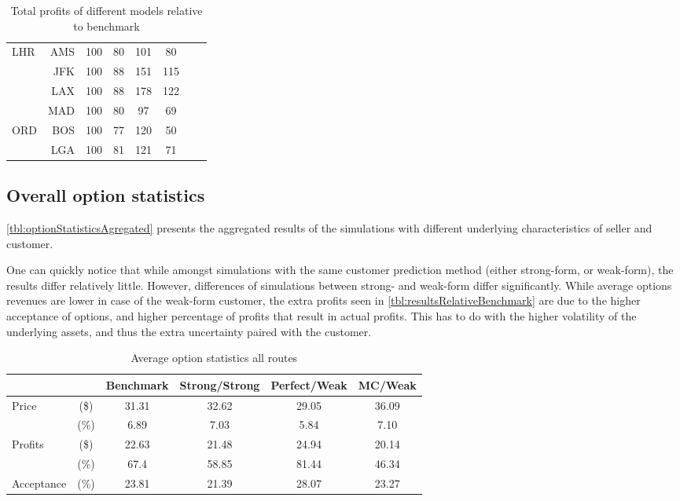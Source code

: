 \begin{table}
\begin{center}
\begin{tabular}{l r c c c c c c}
LHR  &  AMS &    100  &     80  &    101  &     80  \\
     &  JFK &    100  &     88  &    151  &    115  \\
     &  LAX &    100  &     88  &    178  &    122  \\
     &  MAD &    100  &     80  &     97  &     69  \\[.5ex]
ORD  &  BOS &    100  &     77  &    120  &     50  \\
     &  LGA &    100  &     81  &    121  &     71  \\
            \bottomrule
        \end{tabular}
        \caption{Total profits of different models relative to benchmark}
        \label{tbl:resultsRelativeBenchmark}
    \end{center}
\end{table}


\subsection{Overall option statistics}
\autoref{tbl:optionStatisticsAgregated} presents the aggregated results of the simulations with different underlying characteristics of seller and customer.

One can quickly notice that while amongst simulations with the same customer prediction method (either strong-form, or weak-form), the results differ relatively little. However, differences of simulations between strong- and weak-form differ significantly. While average options revenues are lower in case of the weak-form customer, the extra profits seen in \autoref{tbl:resultsRelativeBenchmark} are due to the higher acceptance of options, and higher percentage of profits that result in actual profits. This has to do with the higher volatility of the underlying assets, and thus the extra uncertainty paired with the customer.


\begin{table}[h]
    \small
    \begin{center}
        \begin{tabular}{l c c c c c}
            \toprule
~  &  ~  &  Benchmark  &  Strong/Strong  &  Perfect/Weak  &  MC/Weak \\[.4ex]
            \midrule
Price &  (\$)       &  31.31  &  32.62  &  29.05  &  36.09 \\
~  & (\%)           &  6.89  &  7.03    &  5.84   &  7.10 \\
Profits &  (\$)     & 22.63  &  21.48   &  24.94  &  20.14 \\
~  & (\%)           &  67.4  &  58.85   &  81.44   &  46.34 \\
Acceptance &  (\%)  &  23.81  &  21.39  &  28.07   &  23.27 \\
            \bottomrule
        \end{tabular}
        \caption{Average option statistics all routes}
        \label{tbl:optionStatisticsAgregated}
    \end{center}
\end{table}

